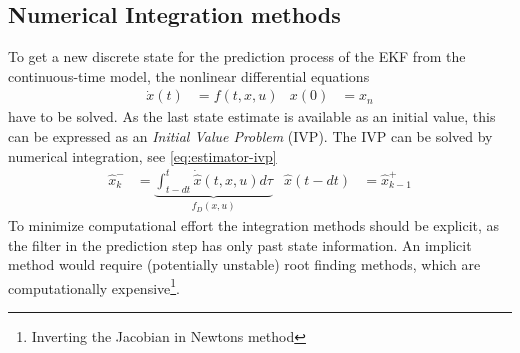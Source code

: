 \subsection{Numerical Integration methods}
\label{sec:numerical-integration}
To get a new discrete state for the prediction process of the EKF from the continuous-time model, the nonlinear differential equations 
\begin{align}
    \dot x(t) &= f(t, x, u) & x(0) &= x_{n} 
\end{align}
have to be solved. 
As the last state estimate is available as an initial value, this can be expressed as an \textit{Initial Value Problem} (IVP). 
The IVP can be solved by numerical integration, see \autoref{eq:estimator-ivp}
\begin{align}
     \hat x_k^- &= \underbrace{\int_{t-dt}^{t} \dot{\hat x}(t,x,u) d\tau}_{f_D(x,u)}
     &
     \hat x (t-dt) &= \hat x_{k-1}^+
\end{align}
To minimize computational effort the integration methods should be explicit, as the filter in the prediction step has only past state information. 
An implicit method would require (potentially unstable) root finding methods, which are computationally expensive\footnote{Inverting the Jacobian in Newtons method}.

